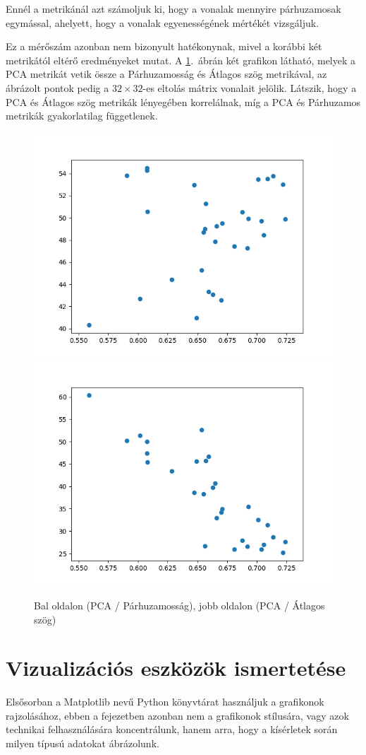 Ennél a metrikánál azt számoljuk ki, hogy a vonalak mennyire párhuzamosak egymással, ahelyett, hogy a vonalak egyenességének mértékét vizsgáljuk. 

Ez a mérőszám azonban nem bizonyult hatékonynak, mivel a korábbi két metrikától eltérő eredményeket mutat. A \ref{para2}.~ábrán két grafikon látható, melyek a PCA metrikát vetik össze a Párhuzamosság és Átlagos szög metrikával, az ábrázolt pontok pedig a $32\times32$-es eltolás mátrix vonalait jelölik. Látszik, hogy a PCA és Átlagos szög metrikák lényegében korrelálnak, míg a PCA és Párhuzamos metrikák gyakorlatilag függetlenek.

\begin{figure}[h!]
	\begin{center}
	\includegraphics[width=0.45\linewidth]{evr-vs-parallelness-ldim10.png}
		\includegraphics[width=0.45\linewidth]{evr-vs-straightness-ldim10.png}
	\end{center}
  \caption{Bal oldalon (PCA / Párhuzamosság), jobb oldalon (PCA / Átlagos szög)}\label{para2}
\end{figure}

\section{Vizualizációs eszközök ismertetése}

Elsősorban a Matplotlib nevű Python könyvtárat használjuk a grafikonok rajzolásához, ebben a fejezetben azonban nem a grafikonok stílusára, vagy azok technikai felhasználására koncentrálunk, hanem arra, hogy a kísérletek során milyen típusú adatokat ábrázolunk.

